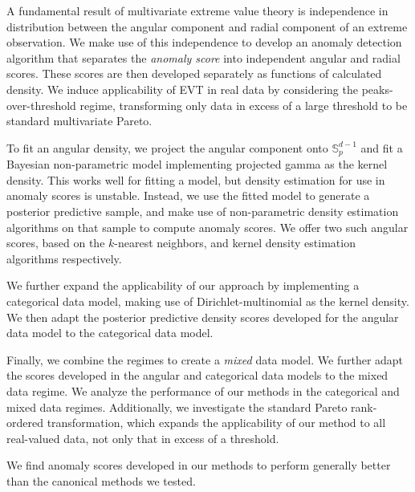 A fundamental result of multivariate extreme value theory is independence
    in distribution between the angular component and radial component of an
    extreme observation.  We make use of this independence to develop an 
    anomaly detection algorithm that separates the \emph{anomaly score} into 
    independent angular and radial scores.  These scores are then developed
    separately as functions of calculated density.  We induce applicability of
    EVT in real data by considering the peaks-over-threshold regime,
    transforming only data in excess of a large threshold to be standard 
    multivariate Pareto.

To fit an angular density, we project the angular component onto 
    $\mathbb{S}_p^{d-1}$ and fit a Bayesian non-parametric model implementing 
    projected gamma as the kernel density. This works well for fitting a model, 
    but density estimation for use in anomaly scores is unstable.
    Instead, we use the fitted model to generate a posterior predictive sample, 
    and make use of non-parametric density estimation algorithms on that sample
    to compute anomaly scores.  We offer two such angular scores, based on the 
    $k$-nearest neighbors, and kernel density estimation algorithms 
    respectively.

We further expand the applicability of our approach by implementing a 
    categorical data model, making use of Dirichlet-multinomial as the kernel 
    density.  We then adapt the posterior predictive density scores developed 
    for the angular data model to the categorical data model.

Finally, we combine the regimes to create a \emph{mixed} data model.  We further
    adapt the scores developed in the angular and categorical data models to the
    mixed data regime.  We analyze the performance of our methods in the 
    categorical and mixed data regimes.  Additionally, we investigate the 
    standard Pareto rank-ordered transformation, which expands the applicability
    of our method to all real-valued data, not only that in excess of a 
    threshold.

We find anomaly scores developed in our methods to perform generally better than
    the canonical methods we tested.

